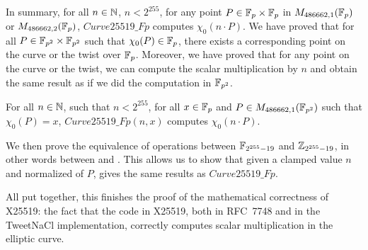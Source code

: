 In summary, for all $n \in \mathbb{N}$, $n < 2^{255}$, for any point $P\in\mathbb{F}_{p}\times\mathbb{F}_{p}$
in $M_{486662,1}(\mathbb{F}_{p})$ or $M_{486662,2}(\mathbb{F}_{p})$, $Curve25519\_Fp$
computes $\chi_0(n \cdot P)$.
We have proved that for all $P \in \mathbb{F}_{p^2}\times\mathbb{F}_{p^2}$ such that $\chi_0(P) \in \mathbb{F}_{p}$,
there exists a corresponding point on the curve or the twist over $\mathbb{F}_{p}$.
Moreover, we have proved that for any point on the curve or the twist, we can compute the
scalar multiplication by $n$ and obtain the same result as if we did the
computation in $\mathbb{F}_{p^2}$.
\begin{theorem}
  \label{thm:general-scalarmult}
  For all $n \in \mathbb{N}$, such that $n < 2^{255}$,
  for all $x \in \mathbb{F}_{p}$ and $P \in M_{486662,1}(\mathbb{F}_{p^2})$ such that $\chi_0(P) = x$,
  $Curve25519\_Fp(n,x)$ computes $\chi_0(n \cdot P)$.
\end{theorem}

We then prove the equivalence of operations between $\mathbb{F}_{2^{255}-19}$ and $\mathbb{Z}_{2^{255}-19}$,
in other words between  and .
This allows us to show that given a clamped value $n$ and normalized \xcoord of $P$,
 gives the same results as $Curve25519\_Fp$.

All put together, this finishes the proof of the mathematical correctness of X25519: the fact that the code in X25519, both in RFC~7748 and
in the TweetNaCl implementation, correctly computes scalar multiplication in the elliptic curve.
